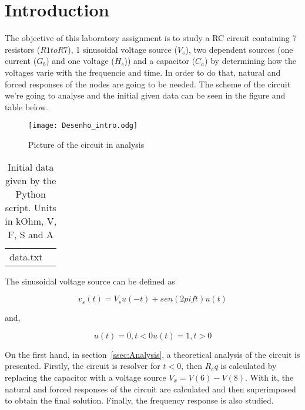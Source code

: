 \section{Introduction}
\label{sec:introduction}

\par The objective of this laboratory assignment is to study a RC circuit containing 7 resistors ($R1 to R7$), 1 sinusoidal voltage source ($V_s$), two dependent sources (one current ($G_b$) and one voltage ($H_c$)) and a capacitor ($C_a$) by determining how the voltages varie with the frequencie and time. In order to do that, natural and forced responses of the nodes are going to be needed.
The scheme of the circuit we're going to analyse and the initial given data can be seen in the figure and table below.

\begin{figure}[h] \centering
\texttt{[image: Desenho\_intro.odg]}
\caption{Picture of the circuit in analysis}
\label{fig:V(t)}
\end{figure}

\begin{table}[H]
\centering
\begin{tabularx}{0.8\textwidth} {
  | >{\raggedright\arraybackslash}X
  | >{\raggedleft\arraybackslash}X | }
 \hline
 \caption{Initial data given by the Python script. Units in kOhm, V, F, S and A}
 data.txt
\end{tabularx}
\end{table}

\par The sinusoidal voltage source can be defined as 

\begin{equation}
  v_s(t) = V_su(-t) + sen(2pift)u(t) 
  \label{eq:vs}
\end{equation}

and,

\begin{equation}
  u(t) = 0, t<0 
  u(t) = 1, t>0
  \label{eq:u(t)}
\end{equation}

\par On the first hand, in section~\ref{ssec:Analysis}, a theoretical analysis of the circuit is
presented. Firstly, the circuit is resolver for $t<0$, then $R_eq$ is calculated by replacing the capacitor with a voltage source $V_x=V(6)-V(8)$. With it, the natural and forced responses of the circuit are calculated and then superimposed to obtain the final solution. Finally, the frequency response is also studied.

